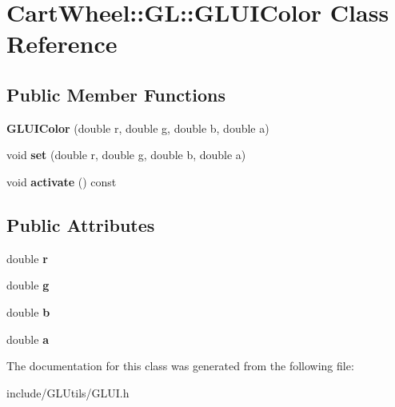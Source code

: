\hypertarget{classCartWheel_1_1GL_1_1GLUIColor}{
\section{CartWheel::GL::GLUIColor Class Reference}
\label{classCartWheel_1_1GL_1_1GLUIColor}
}
\subsection*{Public Member Functions}
\begin{DoxyCompactItemize}
\item 
\hypertarget{classCartWheel_1_1GL_1_1GLUIColor_a161ff672337411684fb1816c9ea75311}{
{\bfseries GLUIColor} (double r, double g, double b, double a)}
\label{classCartWheel_1_1GL_1_1GLUIColor_a161ff672337411684fb1816c9ea75311}

\item 
\hypertarget{classCartWheel_1_1GL_1_1GLUIColor_a5d68ee7279406c34f566ef8fc6da6d55}{
void {\bfseries set} (double r, double g, double b, double a)}
\label{classCartWheel_1_1GL_1_1GLUIColor_a5d68ee7279406c34f566ef8fc6da6d55}

\item 
\hypertarget{classCartWheel_1_1GL_1_1GLUIColor_a8eb12fc1f523f860509c6920b3afa08c}{
void {\bfseries activate} () const }
\label{classCartWheel_1_1GL_1_1GLUIColor_a8eb12fc1f523f860509c6920b3afa08c}

\end{DoxyCompactItemize}
\subsection*{Public Attributes}
\begin{DoxyCompactItemize}
\item 
\hypertarget{classCartWheel_1_1GL_1_1GLUIColor_ac5e6ab9eab477a2d069cbc689c79dac4}{
double {\bfseries r}}
\label{classCartWheel_1_1GL_1_1GLUIColor_ac5e6ab9eab477a2d069cbc689c79dac4}

\item 
\hypertarget{classCartWheel_1_1GL_1_1GLUIColor_a36e1b8debf1ca961ac32fb7f07714862}{
double {\bfseries g}}
\label{classCartWheel_1_1GL_1_1GLUIColor_a36e1b8debf1ca961ac32fb7f07714862}

\item 
\hypertarget{classCartWheel_1_1GL_1_1GLUIColor_aa68bea7f715c0689ac8cf4b8ba321572}{
double {\bfseries b}}
\label{classCartWheel_1_1GL_1_1GLUIColor_aa68bea7f715c0689ac8cf4b8ba321572}

\item 
\hypertarget{classCartWheel_1_1GL_1_1GLUIColor_a79200da821339eae76caa9bdb40967a7}{
double {\bfseries a}}
\label{classCartWheel_1_1GL_1_1GLUIColor_a79200da821339eae76caa9bdb40967a7}

\end{DoxyCompactItemize}


The documentation for this class was generated from the following file:\begin{DoxyCompactItemize}
\item 
include/GLUtils/GLUI.h\end{DoxyCompactItemize}
